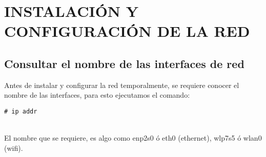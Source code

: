 \chapter{\uppercase{Instalación y configuración de la red}}\label{chap:ins.conf.red}

\newpage

\section{Consultar el nombre de las interfaces de red}
Antes de instalar y configurar la red temporalmente, se requiere conocer el nombre de las interfaces, para esto ejecutamos el comando:\\
\begin{verbatim}
# ip addr
\end{verbatim}
\\[1em]
El nombre que se requiere, es algo como enp2s0 ó eth0 (ethernet), wlp7s5 ó wlan0 (wifi).

